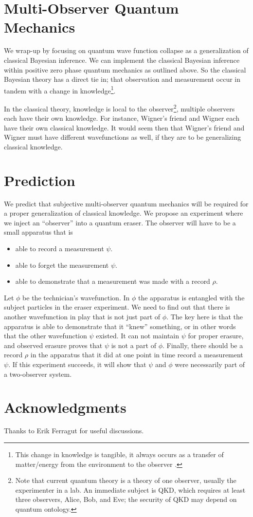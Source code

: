\documentclass[12pt,a4paper]{article}
\begin{document}
\section{Multi-Observer Quantum Mechanics}
We wrap-up by focusing on quantum wave function collapse as a generalization of classical Bayesian inference.  We can implement the classical Bayesian inference within positive zero phase quantum mechanics as outlined above.  So the classical Bayesian theory has a direct tie in; that observation and measurement occur in tandem with a change in knowledge\footnote{This change in knowledge is tangible, it always occurs as a transfer of matter/energy from the environment to the observer \cite{thrust}.}.  

In the classical theory, knowledge is local to the observer\footnote{Note that current quantum theory is a theory of one observer, usually the experimenter in a lab.  An immediate subject is QKD, which requires at least three observers, Alice, Bob, and Eve; the security of QKD may depend on quantum ontology.}, multiple observers each have their own knowledge.  For instance, Wigner's friend and Wigner each have their own classical knowledge.  It would seem then that Wigner's friend and Wigner must have different wavefunctions as well, if they are to be generalizing classical knowledge.

\section{Prediction}

We predict that subjective multi-observer quantum mechanics will be required for a proper generalization of classical knowledge.  We propose an experiment where we inject an ``observer'' into a quantum eraser.  The observer will have to be a small apparatus that is
\begin{itemize}
   \item able to record a measurement $\psi$.
   \item able to forget the measurement $\psi$.
   \item able to demonstrate that a measurement was made with a record $\rho$.
\end{itemize}
Let $\phi$ be the technician's wavefunction.  In $\phi$ the apparatus is entangled with the subject particles in the eraser experiment.  We need to find out that there is another wavefunction in play that is not just part of $\phi$.  The key here is that the apparatus is able to demonstrate that it ``knew'' something, or in other words that the other wavefunction $\psi$ existed.  It can not maintain $\psi$ for proper erasure, and observed erasure proves that $\psi$ is not a part of $\phi$.  Finally, there should be a record $\rho$ in the apparatus that it did at one point in time record a measurement $\psi$.  If this experiment succeeds, it will show that $\psi$ and $\phi$ were necessarily part of a two-observer system.

\section{Acknowledgments}
Thanks to Erik Ferragut for useful discussions.



\end{document}
